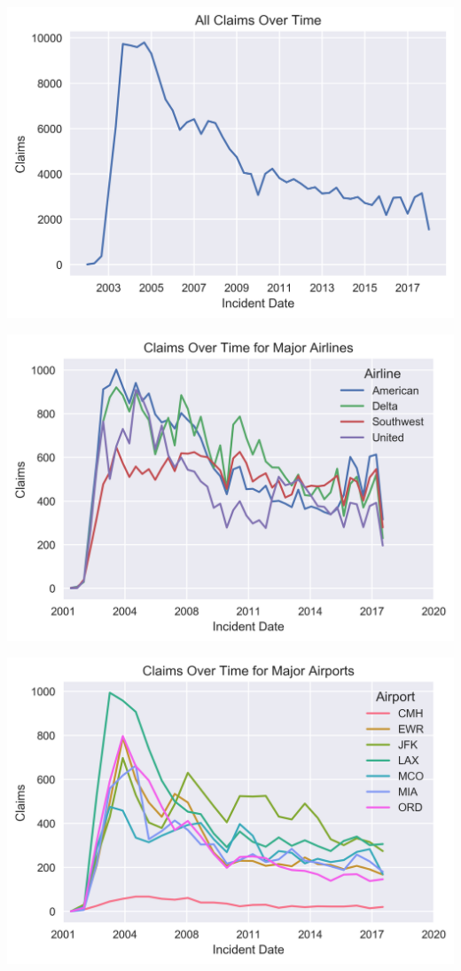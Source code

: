 \documentclass{beamer}
\begin{document}
\begin{frame}
	\includegraphics[keepaspectratio, width = \textwidth, height = \textheight]{../plots/all_claims}
\end{frame}

\begin{frame}
	\includegraphics[keepaspectratio, width = \textwidth, height = \textheight]{../plots/by_airline}
\end{frame}

\begin{frame}
	\includegraphics[keepaspectratio, width = \textwidth, height = \textheight]{../plots/by_airport}
\end{frame}
\end{document}
